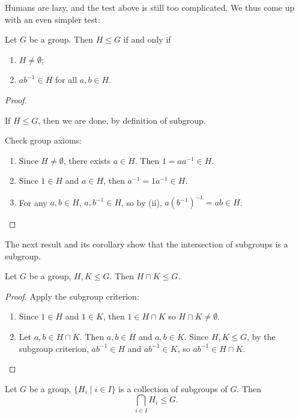 Humans are lazy, and the test above is still too complicated. We thus come up with an even simpler test:

\begin{lemma}
Let $G$ be a group. Then $H\le G$ if and only if
\begin{enumerate}[label=(\roman*)]
\item $H\neq\emptyset$;
\item $ab^{-1}\in H$ for all $a,b\in H$. 
\end{enumerate}
\end{lemma}

\begin{proof} \

\fbox{$\implies$} If $H\le G$, then we are done, by definition of subgroup.

\fbox{$\impliedby$} Check group axioms:
\begin{enumerate}[label=(\roman*)]
\item Since $H\neq\emptyset$, there exists $a\in H$. Then $1=aa^{-1}\in H$.
\item Since $1\in H$ and $a\in H$, then $a^{-1}=1a^{-1}\in H$.
\item For any $a,b\in H$, $a,b^{-1}\in H$, so by (ii), $a(b^{-1})^{-1}=ab\in H$.
\end{enumerate}
\end{proof}

The next result and its corollary show that the intersection of subgroups is a subgroup.

\begin{proposition}
Let $G$ be a group, $H,K\le G$. Then $H\cap K\le G$.
\end{proposition}

\begin{proof}
Apply the subgroup criterion:
\begin{enumerate}[label=(\roman*)]
\item Since $1\in H$ and $1\in K$, then $1\in H\cap K$ so $H\cap K\neq\emptyset$.
\item Let $a,b\in H\cap K$. Then $a,b\in H$ and $a,b\in K$. Since $H,K\le G$, by the subgroup criterion, $ab^{-1}\in H$ and $ab^{-1}\in K$, so $ab^{-1}\in H\cap K$.
\end{enumerate}
\end{proof}

\begin{corollary}
Let $G$ be a group, $\{H_i\mid i\in I\}$ is a collection of subgroups of $G$. Then
\[\bigcap_{i\in I}H_i\le G.\]
\end{corollary}

